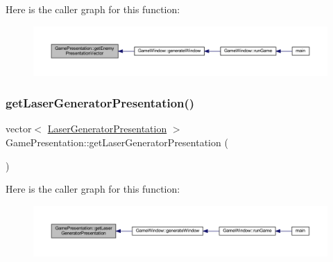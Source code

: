 Here is the caller graph for this function\+:\nopagebreak
\begin{figure}[H]
\begin{center}
\leavevmode
\includegraphics[width=350pt]{class_game_presentation_a903a8e09c19324b2380b5073abd570f0_icgraph}
\end{center}
\end{figure}
\mbox{\label{class_game_presentation_a6da88c7baf912bccf09f274b6a5ae7b6}} 
\subsubsection{\texorpdfstring{get\+Laser\+Generator\+Presentation()}{getLaserGeneratorPresentation()}}
{\footnotesize\ttfamily vector$<$ \hyperlink{class_laser_generator_presentation}{Laser\+Generator\+Presentation} $>$ Game\+Presentation\+::get\+Laser\+Generator\+Presentation (\begin{DoxyParamCaption}{ }\end{DoxyParamCaption})}

Here is the caller graph for this function\+:\nopagebreak
\begin{figure}[H]
\begin{center}
\leavevmode
\includegraphics[width=350pt]{class_game_presentation_a6da88c7baf912bccf09f274b6a5ae7b6_icgraph}
\end{center}
\end{figure}
\mbox{\label{class_game_presentation_a8bb8847556bd4977479df73eec79b2eb}} 
